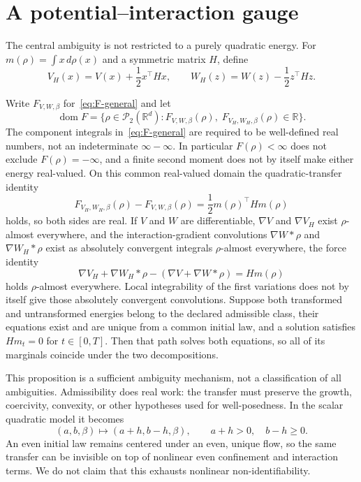 \documentclass[anon,11pt]{alt2027}
\newcommand{\R}{\mathbb{R}}
\newcommand{\Ptwo}{\mathcal{P}_2}
\begin{document}
\section{A potential--interaction gauge}
\label{sec:gauge}

The central ambiguity is not restricted to a purely quadratic energy. For
$m(\rho)=\int x\,d\rho(x)$ and a symmetric matrix $H$, define
\begin{equation}
\label{eq:gauge}
V_H(x)=V(x)+\frac12x^\top Hx,
\qquad
W_H(z)=W(z)-\frac12z^\top Hz.
\end{equation}

\begin{proposition}
\label{prop:gauge}
Write $F_{V,W,\beta}$ for~\eqref{eq:F-general} and let
\[
\operatorname{dom} F
=
\{\rho\in\Ptwo(\R^d):
F_{V,W,\beta}(\rho),\;
F_{V_H,W_H,\beta}(\rho)\in\mathbb R\}.
\]
The component integrals in~\eqref{eq:F-general} are required to be well-defined
real numbers, not an indeterminate $\infty-\infty$. In particular
$F(\rho)<\infty$ does not exclude $F(\rho)=-\infty$, and a finite second moment
does not by itself make either energy real-valued.
On this common real-valued domain the quadratic-transfer identity
\begin{equation}
\label{eq:gauge-energy}
F_{V_H,W_H,\beta}(\rho)-F_{V,W,\beta}(\rho)
=\frac12m(\rho)^\top Hm(\rho)
\end{equation}
holds, so both sides are real. If $V$ and $W$ are differentiable,
$\nabla V$ and $\nabla V_H$ exist $\rho$-almost everywhere, and the
interaction-gradient convolutions $\nabla W*\rho$ and $\nabla W_H*\rho$ exist
as absolutely convergent integrals $\rho$-almost everywhere, the force identity
\begin{equation}
\label{eq:gauge-force}
\nabla V_H+\nabla W_H*\rho-(\nabla V+\nabla W*\rho)
=Hm(\rho)
\end{equation}
holds $\rho$-almost everywhere. Local integrability of the first variations
does not by itself give those absolutely convergent convolutions. Suppose both
transformed and untransformed energies belong to the declared admissible class,
their equations exist and are unique from a common initial law, and a solution
satisfies $Hm_t=0$ for $t\in[0,T]$. Then that path solves both equations, so
all of its marginals coincide under the two decompositions.
\end{proposition}

This proposition is a sufficient ambiguity mechanism, not a classification of
all ambiguities. Admissibility does real work: the transfer must preserve the
growth, coercivity, convexity, or other hypotheses used for well-posedness. In
the scalar quadratic model it becomes
\begin{equation}
\label{eq:scalar-ridge}
(a,b,\beta)\longmapsto(a+h,b-h,\beta),
\qquad a+h>0,\quad b-h\ge0.
\end{equation}
An even initial law remains centered under an even, unique flow, so the same
transfer can be invisible on top of nonlinear even confinement and interaction
terms. We do not claim that this exhausts nonlinear non-identifiability.
\end{document}
